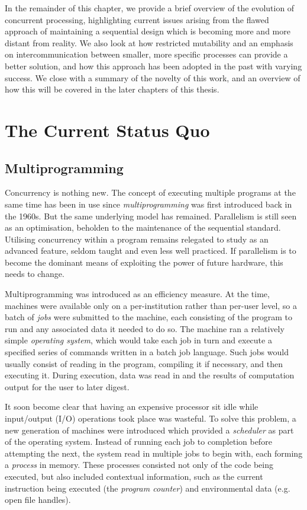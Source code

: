 In the remainder of this chapter, we provide a brief overview of the
evolution of concurrent processing, highlighting current issues
arising from the flawed approach of maintaining a sequential design
which is becoming more and more distant from reality.  We also look at
how restricted mutability and an emphasis on intercommunication
between smaller, more specific processes can provide a better
solution, and how this approach has been adopted in the past with
varying success.  We close with a summary of the novelty of this work,
and an overview of how this will be covered in the later chapters of
this thesis.

\section{The Current Status Quo}

\subsection{Multiprogramming}

Concurrency is nothing new.  The concept of executing multiple
programs at the same time has been in use since
\emph{multiprogramming} was first introduced back in the 1960s.  But
the same underlying model has remained.  Parallelism is still seen as
an optimisation, beholden to the maintenance of the sequential
standard.  Utilising concurrency within a program remains relegated to
study as an advanced feature, seldom taught and even less well
practiced.  If parallelism is to become the dominant means of
exploiting the power of future hardware, this needs to change.

Multiprogramming was introduced as an efficiency measure.  At the
time, machines were available only on a per-institution rather than
per-user level, so a batch of \emph{jobs} were submitted to the
machine, each consisting of the program to run and any associated data
it needed to do so.  The machine ran a relatively simple
\emph{operating system}, which would take each job in turn and execute
a specified series of commands written in a batch job language.  Such
jobs would usually consist of reading in the program, compiling it if
necessary, and then executing it.  During execution, data was read in
and the results of computation output for the user to later digest.

It soon become clear that having an expensive processor sit idle while
input/output (I/O) operations took place was wasteful.  To solve this
problem, a new generation of machines were introduced which provided a
\emph{scheduler} as part of the operating system.  Instead of running
each job to completion before attempting the next, the system read in
multiple jobs to begin with, each forming a \emph{process} in memory.
These processes consisted not only of the code being executed, but
also included contextual information, such as the current instruction
being executed (the \emph{program counter}) and environmental data
(e.g. open file handles).

